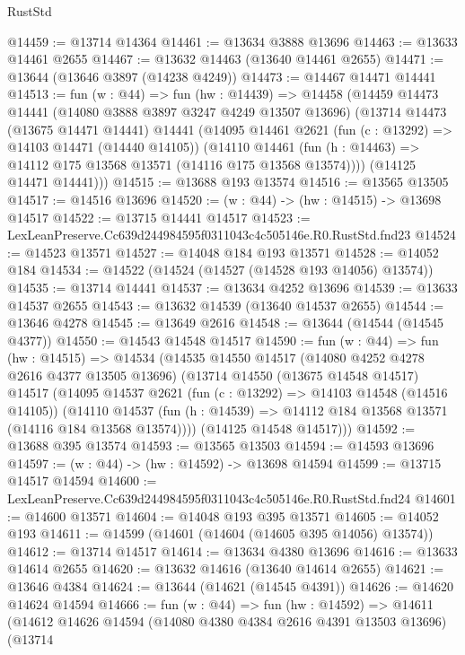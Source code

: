 \begin{lexlean}{RustStd}
\begin{coremodule}
@14459 := @13714 @14364
@14461 := @13634 @3888 @13696
@14463 := @13633 @14461 @2655
@14467 := @13632 @14463 (@13640 @14461 @2655)
@14471 := @13644 (@13646 @3897 (@14238 @4249))
@14473 := @14467 @14471 @14441
@14513 := fun (w : @44) =>
  fun (hw : @14439) =>
  @14458
    (@14459
      @14473
      @14441
      (@14080 @3888 @3897 @3247 @4249 @13507 @13696)
      (@13714
        @14473
        (@13675 @14471 @14441)
        @14441
        (@14095
          @14461
          @2621
          (fun (c : @13292) => @14103 @14471 (@14440 @14105))
          (@14110
            @14461
            (fun (h : @14463) => @14112 @175 @13568 @13571 (@14116 @175 @13568 @13574))))
        (@14125 @14471 @14441)))
@14515 := @13688 @193 @13574
@14516 := @13565 @13505
@14517 := @14516 @13696
@14520 := (w : @44) -> (hw : @14515) -> @13698 @14517
@14522 := @13715 @14441 @14517
@14523 := LexLeanPreserve.Cc639d244984595f0311043c4c505146e.R0.RustStd.fnd23
@14524 := @14523 @13571
@14527 := @14048 @184 @193 @13571
@14528 := @14052 @184
@14534 := @14522 (@14524 (@14527 (@14528 @193 @14056) @13574))
@14535 := @13714 @14441
@14537 := @13634 @4252 @13696
@14539 := @13633 @14537 @2655
@14543 := @13632 @14539 (@13640 @14537 @2655)
@14544 := @13646 @4278
@14545 := @13649 @2616
@14548 := @13644 (@14544 (@14545 @4377))
@14550 := @14543 @14548 @14517
@14590 := fun (w : @44) =>
  fun (hw : @14515) =>
  @14534
    (@14535
      @14550
      @14517
      (@14080 @4252 @4278 @2616 @4377 @13505 @13696)
      (@13714
        @14550
        (@13675 @14548 @14517)
        @14517
        (@14095
          @14537
          @2621
          (fun (c : @13292) => @14103 @14548 (@14516 @14105))
          (@14110
            @14537
            (fun (h : @14539) => @14112 @184 @13568 @13571 (@14116 @184 @13568 @13574))))
        (@14125 @14548 @14517)))
@14592 := @13688 @395 @13574
@14593 := @13565 @13503
@14594 := @14593 @13696
@14597 := (w : @44) -> (hw : @14592) -> @13698 @14594
@14599 := @13715 @14517 @14594
@14600 := LexLeanPreserve.Cc639d244984595f0311043c4c505146e.R0.RustStd.fnd24
@14601 := @14600 @13571
@14604 := @14048 @193 @395 @13571
@14605 := @14052 @193
@14611 := @14599 (@14601 (@14604 (@14605 @395 @14056) @13574))
@14612 := @13714 @14517
@14614 := @13634 @4380 @13696
@14616 := @13633 @14614 @2655
@14620 := @13632 @14616 (@13640 @14614 @2655)
@14621 := @13646 @4384
@14624 := @13644 (@14621 (@14545 @4391))
@14626 := @14620 @14624 @14594
@14666 := fun (w : @44) =>
  fun (hw : @14592) =>
  @14611
    (@14612
      @14626
      @14594
      (@14080 @4380 @4384 @2616 @4391 @13503 @13696)
      (@13714

\end{coremodule}
\end{lexlean}
